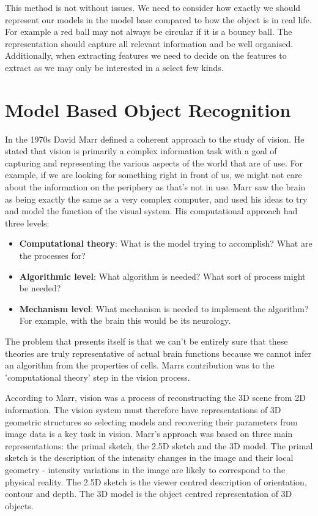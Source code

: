 \documentclass{article}
\begin{document}
	\par 
	This method is not without issues. We need to consider how exactly we should represent our models in the model base compared to how the object is in real life. For example a red ball may not always be circular if it is a bouncy ball. The representation should capture all relevant information and be well organised. Additionally, when extracting features we need to decide on the features to extract as we may only be interested in a select few kinds.
	
	\section{Model Based Object Recognition}
	In the 1970s David Marr defined a coherent approach to the study of vision. He stated that vision is primarily a complex information task with a goal of capturing and representing the various aspects of the world that are of use. For example, if we are looking for something right in front of us, we might not care about the information on the periphery as that's not in use. Marr saw the brain as being exactly the same as a very complex computer, and used his ideas to try and model the function of the visual system. His computational approach had three levels:
	\begin{itemize}
		\item \textbf{Computational theory}: What is the model trying to accomplish? What are the processes for?
		\item \textbf{Algorithmic level}: What algorithm is needed? What sort of process might be needed?
		\item \textbf{Mechanism level}: What mechanism is needed to implement the algorithm? For example, with the brain this would be its neurology.
	\end{itemize}
	
	The problem that presents itself is that we can't be entirely sure that these theories are truly representative of actual brain functions because we cannot infer an algorithm from the properties of cells. Marrs contribution was to the 'computational theory' step in the vision process.
	
	\par 
	According to Marr, vision was a process of reconstructing the 3D scene from 2D information. The vision system must therefore have representations of 3D geometric structures so selecting models and recovering their parameters from image data is a key task in vision. Marr's approach was based on three main representations: the primal sketch, the 2.5D sketch and the 3D model. The primal sketch is the description of the intensity changes in the image and their local geometry - intensity variations in the image are likely to correspond to the physical reality. The 2.5D sketch is the viewer centred description of orientation, contour and depth. The 3D model is the object centred representation of 3D objects.
	
\end{document}
